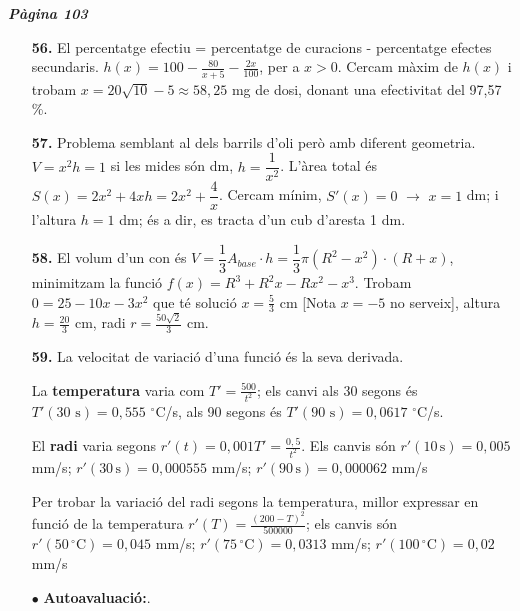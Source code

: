 \documentclass[a4paper, pdf, twoside]{book}
\begin{document}
{\textbf{\em Pàgina 103}} \hrulefill
\begin{enumerate}
\vspace{0.25cm}
\item[\fontfamily{phv}\selectfont\color{blue}\textbf{56. }] 
El percentatge efectiu = percentatge de curacions - percentatge efectes secundaris. $h(x)=100-\frac {80}{x+5} - \frac {2x}{100}$, per a $x>0$. Cercam màxim de $h(x)$ i trobam $x=20\sqrt {10}-5\approx 58,25$ mg de dosi, donant una efectivitat del 97,57 \%.
 \end{enumerate}
\begin{enumerate}
\vspace{0.25cm}
\item[\fontfamily{phv}\selectfont\color{blue}\textbf{57. }] 
Problema semblant al dels barrils d'oli però amb diferent geometria. $V=x^2 h = 1$ si les mides són dm, $h=\dfrac {1}{x^2}$. L'àrea total és $S(x)=2 x^2 + 4x h = 2x^2 + \dfrac {4}{x}$. Cercam mínim, $S'(x)=0$ $\rightarrow $ $x=1$ dm; i l'altura $h=1$ dm; és a dir, es tracta d'un cub d'aresta 1 dm.
\vspace{0.25cm}
\item[\fontfamily{phv}\selectfont\color{blue}\textbf{58. }] 
El volum d'un con és $V=\dfrac {1}{3}A_{base}\cdot h = \dfrac {1}{3}\pi (R^2-x^2)\cdot (R+x)$, minimitzam la funció $f(x)=R^3 + R^2x-Rx^2-x^3$. Trobam $0 = 25-10x-3x^2$ que té solució $x=\frac {5}{3}$ cm [Nota $x=-5$ no serveix], altura $h=\frac {20}{3}$ cm, radi $r=\frac {50\sqrt {2}}{3}$ cm.
\vspace{0.25cm}
\item[\fontfamily{phv}\selectfont\color{blue}\textbf{59. }] 
La velocitat de variació d'una funció és la seva derivada.\par La \textbf {temperatura} varia com $T'=\frac {500}{t^2}$; els canvi als 30 segons és $T'(\text {30 s})=0,555$ $^\circ $C/s, als 90 segons és $T'(\text {90 s})=0,0617$ $^\circ $C/s.\par El \textbf {radi} varia segons $r'(t)=0,001 T'=\frac {0,5}{t^2}$. Els canvis són $r'(10\, \text {s})=0,005$ mm/s; $r'(30\, \text {s})=0,000555$ mm/s; $r'(90\, \text {s})= 0,000062$ mm/s \par Per trobar la variació del radi segons la temperatura, millor expressar en funció de la temperatura $r'(T)=\frac {(200-T)^2}{500 000}$; els canvis són $r'(50 \, {}^\circ \text {C})=0,045$ mm/s; $r'(75 \, {}^\circ \text {C})=0,0313$ mm/s; $r'(100 \, {}^\circ \text {C})=0,02$ mm/s
\vspace{0.25cm}
 \item[$\bullet$ ] {\selectfont\color{blue}\textbf{Autoavaluació:}. }


\end{enumerate}
\end{document}
